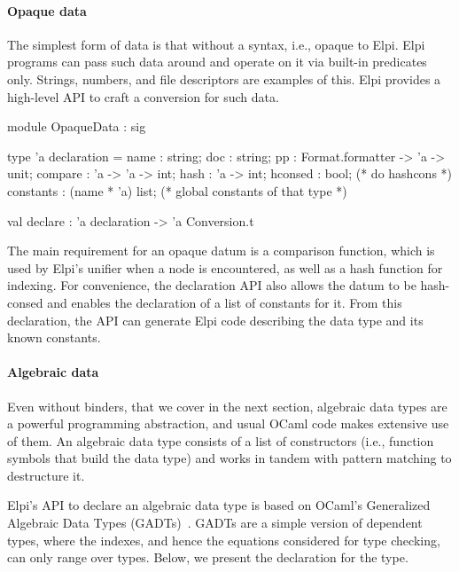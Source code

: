 \documentclass{these-ISSS}
\newenvironment{elpicode}
  {\VerbatimEnvironment\begin{elpibox}\begin{xelpicode}}{\end{xelpicode}
\end{elpibox}}
\newenvironment{ocamlcode}
  {\VerbatimEnvironment\begin{ocamlbox}\begin{xocamlcode}}{\end{xocamlcode}
\end{ocamlbox}}
\begin{document}
\paragraph{Opaque data}

The simplest form of data is that without a syntax, i.e., opaque to Elpi. Elpi
programs can pass such data around and operate on it via built-in predicates
only. Strings, numbers, and file descriptors are examples of this. Elpi
provides a high-level API to craft a conversion for such data.

\begin{ocamlcode}
module OpaqueData : sig

  type 'a declaration = {
    name : string;
    doc : string;
    pp : Format.formatter -> 'a -> unit;
    compare : 'a -> 'a -> int;
    hash : 'a -> int;
    hconsed : bool;               (* do hashcons *)
    constants : (name * 'a) list; (* global constants of that type *)
  }

  val declare : 'a declaration -> 'a Conversion.t
\end{ocamlcode}

\noindent
The main requirement for an opaque datum is a comparison function, which is
used by Elpi's unifier when a  node is encountered, as well as a
hash function for indexing. For convenience, the declaration API also allows
the datum to be hash-consed and enables the declaration of a list of constants
for it. From this declaration, the API can generate Elpi code describing the
data type and its known constants.


\paragraph{Algebraic data}

Even without binders, that we cover in the next section,
algebraic data types are a powerful programming
abstraction, and usual OCaml code makes extensive use of them. An algebraic
data type consists of a list of constructors (i.e., function symbols that build
the data type) and works in tandem with pattern matching to destructure it.

Elpi's API to declare an algebraic data type is based on
OCaml's Generalized Algebraic Data Types (GADTs)~\cite{SHEARD200849}.
GADTs are a simple version of dependent types, where the indexes, and hence
the equations considered for type checking, can only range over types.
Below, we present the declaration for the  type.
\end{document}
